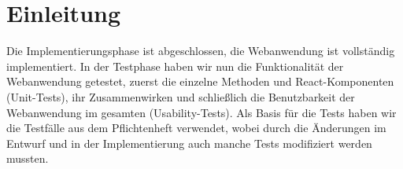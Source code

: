 \section{Einleitung}
Die Implementierungsphase ist abgeschlossen, die Webanwendung ist vollständig implementiert. In der Testphase haben wir nun die Funktionalität der Webanwendung getestet, zuerst die einzelne Methoden und React-Komponenten (Unit-Tests), ihr Zusammenwirken und schließlich die Benutzbarkeit der Webanwendung im gesamten (Usability-Tests).
Als Basis für die Tests haben wir die Testfälle aus dem Pflichtenheft verwendet, wobei durch die Änderungen im Entwurf und in der Implementierung auch manche Tests modifiziert werden mussten.
